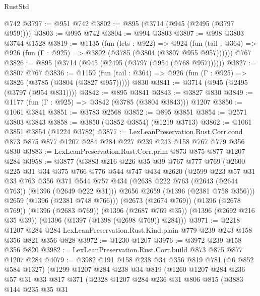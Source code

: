 \begin{lexlean}{RustStd}
\begin{coremodule}
{\begin{coremodule}
{{{{{{{{{    @742
@3797 := @951 @742
@3802 := @895 (@3714 (@945 (@2495 (@3797 @959))))
@3803 := @995 @742
@3804 := @994 @3803
@3807 := @998 @3803 @3744 @1528
@3819 := @1135
    (fun (lets : @922) =>
    @924 (fun (tail : @364) => @926 (fun (Γ : @925) => @3802 (@3785 (@3804 (@3807 @955 @957))))))
    @767
@3826 := @895 (@3714 (@945 (@2495 (@3797 (@954 (@768 @957))))))
@3827 := @3807 @767
@3836 := @1159
    (fun (tail : @364) => @926 (fun (Γ : @925) => @3826 (@3785 (@3804 (@3827 @957)))))
    @830
@3841 := @3714 (@945 (@2495 (@3797 (@954 @831))))
@3842 := @895 @3841
@3843 := @3827 @830
@3849 := @1177 (fun (Γ : @925) => @3842 (@3785 (@3804 @3843))) @1207
@3850 := @1061 @3841
@3851 := @3783 @2568
@3852 := @895 @3851
@3854 := @2571 @3803 @3843
@3858 := @3850 (@3852 @3854) (@1219 @3713)
@3862 := @1061 @3851 @3854 (@1224 @3782)
@3877 := LexLeanPreservation.Rust.Corr.cond
    @873
    @875
    @877
    @1207
    @284
    @284
    @227
    @239
    @243
    @158
    @767
    @779
    @356
    @830
@3883 := LexLeanPreservation.Rust.Corr.prim @873 @875 @877 @1207 @284
@3958 := @3877
    (@3883
      @216
      @226
      @35
      @39
      @767
      @777
      @769
      (@2600
        @225
        @31
        @34
        @375
        @766
        @776
        @544
        @747
        @434
        @2620
        (@2599
          @223
          @57
          @31
          @33
          @763
          @356
          @371
          @544
          @757
          @434
          (@2638 @222 @763 (@2643 (@2644 @763)) (@1396 (@2649 @222 @31)))
          @2656
          @2659
          (@1396 (@2381 @758 @356)))
        @2659
        (@1396 (@2381 @748 @766)))
      (@2673 (@2674 @769))
      (@1396 (@2678 @769))
      (@1396 (@2683 @769))
      (@1396 (@2687 @769 @35))
      (@1396 (@2692 @216 @35 @39))
      (@1396 (@1397 (@1398 (@2698 @769)) @284)))
@3971 := @2218
    @1207
    @284
    @284
    LexLeanPreservation.Rust.Kind.plain
    @779
    @239
    @243
    @158
    @356
    @821
    @356
    @828
@3972 := @1230 @1207
@3976 := @3972 @239 @158 @356 @820
@3982 := LexLeanPreservation.Rust.Corr.build @873 @875 @877 @1207 @284
@4079 := @3982
    @191
    @158
    @238
    @34
    @356
    @819
    @781
    (@6 @852 @584 @1327)
    (@1299
      @1207
      @284
      @238
      @34
      @819
      (@1260
        @1207
        @284
        @236
        @57
        @31
        @33
        @817
        @371
        (@2328
          @1207
          @284
          @236
          @31
          @806
          @815
          (@3883
            @144
            @235
            @35
            @31
}}}}}}}}}
\end{coremodule}}
\end{coremodule}
\end{lexlean}
